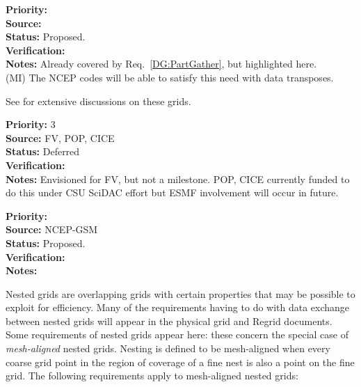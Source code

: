 \begin{reqlist}
{\bf Priority:} \\
{\bf Source:} \\
{\bf Status:} Proposed. \\
{\bf Verification:} \\
{\bf Notes:} Already covered by Req.~\ref{DG:PartGather}, but
  highlighted here.
  \\ (MI) The NCEP codes will be able to satisfy this need with data transposes.
\end{reqlist}



See \cite{art:heikes+:geodesic,art:majewski+:gme} for extensive
discussions on these grids.

\begin{reqlist}
{\bf Priority:} 3 \\ 
{\bf Source:} FV, POP, CICE \\
{\bf Status:} Deferred \\
{\bf Verification:} \\
{\bf Notes:} Envisioned for FV, but not a milestone.  POP, CICE
             currently funded to do this under CSU SciDAC effort
             but ESMF involvement will occur in future.
\end{reqlist}


\begin{reqlist}
{\bf Priority:} \\
{\bf Source:} NCEP-GSM \\
{\bf Status:} Proposed. \\
{\bf Verification:} \\
{\bf Notes:}
\end{reqlist}


Nested grids are overlapping grids with certain properties that may be
possible to exploit for efficiency. Many of the requirements having to
do with data exchange between nested grids will appear in the physical grid
and Regrid documents. Some requirements of nested grids appear here:
these concern the special case of \emph{mesh-aligned} nested
grids. Nesting is defined to be mesh-aligned when every coarse grid
point in the region of coverage of a fine nest is also a point on the
fine grid. The following requirements apply to mesh-aligned nested
grids:


